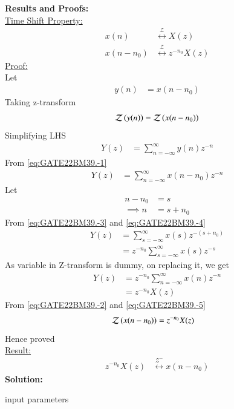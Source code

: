 \documentclass[journal,12pt,onecolumn]{IEEEtran}
\theoremstyle{remark}
\begin{document}
\textbf{Results and Proofs: \\}
\underline{Time Shift Property:}
\begin{align}
x(n) &\overset{\mathcal{Z}}{\longleftrightarrow} X(z) \\
x(n-n_0) &\overset{\mathcal{Z}}{\longleftrightarrow} z^{-n_0}X(z) 
\end{align}
\underline{Proof:} \\
Let
\begin{align}
y(n) &= x(n-n_0) \label{eq:GATE22BM39.-1}
\end{align}
Taking z-transform
\begin{align}
\mathcal{Z}\brak{y(n)} &= \mathcal{Z}\brak{x(n-n_0)} \label{eq:GATE22BM39.-2}\\
\end{align}
Simplifying LHS
\begin{align}
Y(z) &= \sum_{n=-\infty}^{\infty} y(n)z^{-n} 
\end{align}
From \eqref{eq:GATE22BM39.-1}
\begin{align}
Y(z) &= \sum_{n=-\infty}^{\infty} x(n-n_0) z^{-n} \label{eq:GATE22BM39.-3}
\end{align}
Let 
\begin{align}
n-n_0 &= s  \\\implies
n &= s+n_0 \label{eq:GATE22BM39.-4}
\end{align}
From \eqref{eq:GATE22BM39.-3} and \eqref{eq:GATE22BM39.-4}
\begin{align}
Y(z) &= \sum_{s=-\infty}^{\infty} x(s) z^{-(s+n_0)} \\
&= z^{-n_0}\sum_{s=-\infty}^{\infty} x(s) z^{-s} 
\end{align}
As variable in Z-transform is dummy, on replacing it, we get
\begin{align}
Y(z) &= z^{-n_0}\sum_{n=-\infty}^{\infty} x(n) z^{-n} \\
&= z^{-n_0}X(z) \label{eq:GATE22BM39.-5}
\end{align}
From \eqref{eq:GATE22BM39.-2} and \eqref{eq:GATE22BM39.-5}
\begin{align}
\mathcal{Z}\left(x(n-n_0)\right) &= z^{-n_0}X(z)
\end{align}
Hence proved \\
\underline{Result:}
\begin{align}
z^{-n_0}X(z) &\overset{\mathcal{Z^{-}}}{\longleftrightarrow} x(n-n_0) \label{eq:GATE22BM39.-6}
\end{align}
\textbf{Solution:  }
\begin{table}[h]
    \centering
        
    \caption{input parameters}
    \label{tab:GATE22BM39.1}
\end{table}
\end{document}
